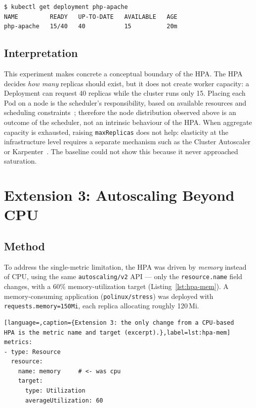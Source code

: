 \documentclass[conference]{IEEEtran}
\begin{document}
\begin{lstlisting}[caption={Saturation: 15 of 40 requested replicas are Ready;
the rest cannot be scheduled for lack of CPU.},label=lst:ready]
$ kubectl get deployment php-apache
NAME         READY   UP-TO-DATE   AVAILABLE   AGE
php-apache   15/40   40           15          20m
\end{lstlisting}

\subsection{Interpretation}
This experiment makes concrete a conceptual boundary of the HPA. The HPA decides
\emph{how many} replicas should exist, but it does not create worker capacity: a
Deployment can request 40 replicas while the cluster runs only 15. Placing each
Pod on a node is the scheduler's responsibility, based on available resources and
scheduling constraints~\cite{k8s-topology}; therefore the node distribution
observed above is an outcome of the scheduler, not an intrinsic behaviour of the
HPA. When aggregate capacity is exhausted, raising \texttt{maxReplicas} does not
help: elasticity at the infrastructure level requires a separate mechanism such
as the Cluster Autoscaler or Karpenter~\cite{aws-autoscaling,survey-k8s-2022}.
The baseline could not show this because it never approached saturation.

\section{Extension 3: Autoscaling Beyond CPU}
\label{sec:ext3}
\subsection{Method}
To address the single-metric limitation, the HPA was driven by \emph{memory}
instead of CPU, using the same \texttt{autoscaling/v2} API --- only the
\texttt{resource.name} field changes, with a 60\% memory-utilization target
(Listing~\ref{lst:hpa-mem}). A memory-consuming application
(\texttt{polinux/stress}) was deployed with \texttt{requests.memory=150Mi}, each
replica allocating roughly 120\,Mi.

\begin{lstlisting}[language=,caption={Extension 3: the only change from a CPU-based
HPA is the metric name and target (excerpt).},label=lst:hpa-mem]
metrics:
- type: Resource
  resource:
    name: memory     # <- was cpu
    target:
      type: Utilization
      averageUtilization: 60
\end{lstlisting}
\end{document}
